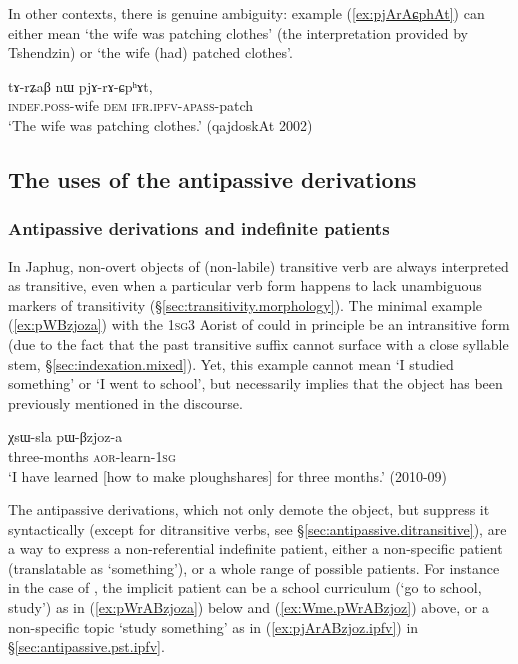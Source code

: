 In other contexts, there is genuine ambiguity: example (\ref{ex:pjArAɕphAt}) can either mean `the wife was patching clothes' (the interpretation provided by Tshendzin) or `the wife (had) patched clothes'.

\begin{exe}
\ex \label{ex:pjArAɕphAt}
\gll tɤ-rʑaβ nɯ pjɤ-rɤ-ɕpʰɤt, \\
\textsc{indef}.\textsc{poss}-wife \textsc{dem} \textsc{ifr}.\textsc{ipfv}-\textsc{apass}-patch \\
\glt `The wife was patching clothes.' (qajdoskAt 2002)
\end{exe}

  \subsection{The uses of the antipassive derivations } \label{sec:antipassive.function}

  \subsubsection{Antipassive derivations and indefinite patients } \label{sec:antipassive.indefinite.patient}
In Japhug, non-overt objects of (non-labile) transitive verb are always interpreted as transitive, even when a particular verb form happens to lack unambiguous markers of transitivity (§\ref{sec:transitivity.morphology}). The minimal example (\ref{ex:pWBzjoza}) with the \textsc{1sg}\fl{}3 Aorist of  could in principle be an intransitive form (due to the fact that the past transitive  suffix cannot surface with a close syllable stem, §\ref{sec:indexation.mixed}). Yet, this example cannot mean `I studied something' or `I went to school', but necessarily implies that the object has been previously mentioned in the discourse. 

\begin{exe}
\ex \label{ex:pWBzjoza}
\gll χsɯ-sla pɯ-βzjoz-a \\
three-months \textsc{aor}-learn-\textsc{1sg} \\
\glt `I have learned [how to make ploughshares] for three months.' (2010-09)
\end{exe}

The antipassive derivations, which not only demote the object, but suppress it syntactically (except for ditransitive verbs, see §\ref{sec:antipassive.ditransitive}), are a way to express a non-referential indefinite patient, either a non-specific patient (translatable as `something'), or a whole range of possible patients.  For instance in the case of , the implicit patient can be a school curriculum (`go to school, study')  as in (\ref{ex:pWrABzjoza}) below and (\ref{ex:Wme.pWrABzjoz}) above, or a non-specific topic `study something' as in (\ref{ex:pjArABzjoz.ipfv}) in §\ref{sec:antipassive.pst.ipfv}.

